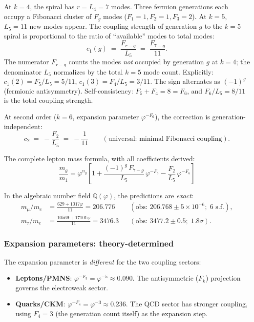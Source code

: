 \documentclass[12pt,a4paper]{article}
\begin{document}
At $k = 4$, the spiral has $r = L_4 = 7$ modes. Three fermion generations each occupy a Fibonacci cluster of $F_g$ modes ($F_1 = 1, F_2 = 1, F_3 = 2$). At $k = 5$, $L_5 = 11$ new modes appear. The coupling strength of generation $g$ to the $k = 5$ spiral is proportional to the ratio of ``available'' modes to total modes:
\begin{equation}
c_1(g) \;=\; \frac{F_{r-g}}{L_5} \;=\; \frac{F_{7-g}}{11}.
\end{equation}
The numerator $F_{r-g}$ counts the modes \emph{not} occupied by generation $g$ at $k = 4$; the denominator $L_5$ normalizes by the total $k = 5$ mode count. Explicitly: $c_1(2) = F_5/L_5 = 5/11$, $c_1(3) = F_4/L_5 = 3/11$. The sign alternates as $(-1)^g$ (fermionic antisymmetry). Self-consistency: $F_5 + F_4 = 8 = F_6$, and $F_6/L_5 = 8/11$ is the total coupling strength.

At second order ($k = 6$, expansion parameter $\varphi^{-F_6}$), the correction is generation-independent:
\begin{equation}
c_2 \;=\; -\frac{F_2}{L_5} \;=\; -\frac{1}{11} \qquad (\text{universal: minimal Fibonacci coupling}).
\end{equation}

The complete lepton mass formula, with all coefficients derived:
\begin{equation}
\boxed{\frac{m_g}{m_1} = \varphi^{n_g} \left[1 + \frac{(-1)^g\, F_{7-g}}{L_5}\, \varphi^{-F_5} - \frac{F_2}{L_5}\, \varphi^{-F_6}\right]}
\label{eq:correction}
\end{equation}

In the algebraic number field $\mathbb{Q}(\varphi)$, the predictions are \emph{exact}:
\begin{align}
m_\mu / m_e &= \frac{629 + 1017\varphi}{11} = 206.776 && (\text{obs: } 206.768 \pm 5{\times}10^{-6};\; \text{6 s.f.}), \\
m_\tau / m_e &= \frac{10569 + 17101\varphi}{11} = 3476.3 && (\text{obs: } 3477.2 \pm 0.5;\; 1.8\sigma).
\end{align}

\subsubsection{Expansion parameters: theory-determined}

The expansion parameter is \emph{different} for the two coupling sectors:
\begin{itemize}
\item \textbf{Leptons/PMNS}: $\varphi^{-F_5} = \varphi^{-5} \approx 0.090$. The antisymmetric ($F_k$) projection governs the electroweak sector.
\item \textbf{Quarks/CKM}: $\varphi^{-F_4} = \varphi^{-3} \approx 0.236$. The QCD sector has stronger coupling, using $F_4 = 3$ (the generation count itself) as the expansion step.
\end{itemize}
\end{document}
